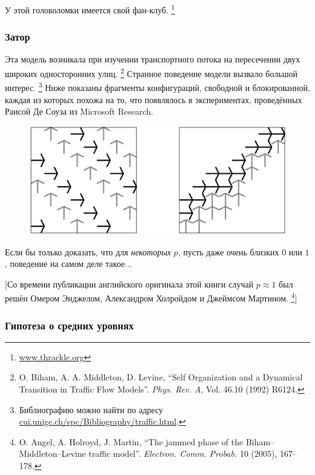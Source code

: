 У этой головоломки имеется свой фан-клуб.%
\footnote{\href{http://www.thrackle.org}{\url{www.thrackle.org}}}

\subsubsection*{Затор}

Эта модель возникала при изучении транспортного потока на пересечении двух широких односторонних улиц.%
\footnote{O. Biham, A. A. Middleton, D. Levine, ``Self Organization and a Dynamical Transition in Traffic Flow Models''. \emph{Phys. Rev. A}, Vol. 46.10 (1992) R6124.}
Странное поведение модели вызвало большой интерес.%
\footnote{Библиографию можно найти по адресу \href{http://cui.unige.ch/spc/Bibliography/traffic.html.}{\url{cui.unige.ch/spc/Bibliography/traffic.html}}.}
Ниже показаны фрагменты конфигураций, свободной и блокированной, каждая из которых похожа на то, что появлялось в экспериментах, проведённых Раисой Де Соуза из Microsoft Research.

\begin{figure}[h!]
\centering
\includegraphics[scale=0.5]{Figs/UnsolvedPuzzles/gridlock}
\end{figure}

Если бы только доказать, что для \emph{некоторых} $p$, пусть даже очень близких $0$ или $1$, поведение на самом деле такое...

[Со времени публикации английского оригинала этой книги случай $p\approx 1$ был решён Омером Энджелом,
Александром Холройдом и Джеймсом Мартином.%
\footnote{O. Angel, A. Holroyd, J. Martin, 
``The jammed phase of the Biham--Middleton--Levine traffic model''.
\emph{Electron. Comm. Probab.} 10 (2005), 167--178.}]

\subsubsection*{Гипотеза о средних уровнях}

